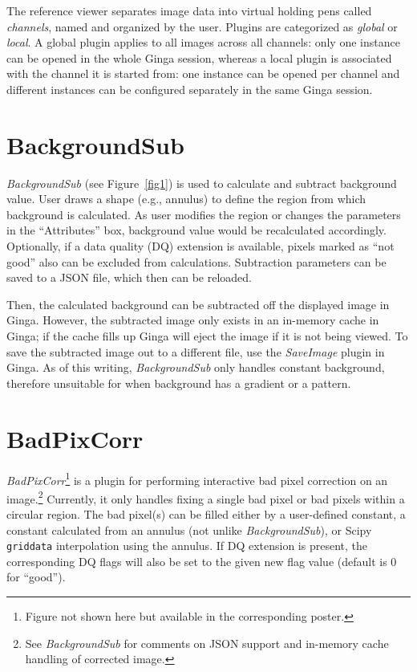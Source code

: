 \documentclass[11pt,twoside]{article}
\begin{document}
The reference viewer separates image data into virtual holding pens
called \emph{channels}, named and organized by the user.
Plugins are categorized as \emph{global} or \emph{local}.  A global
plugin applies to all images across all channels: only one instance can
be opened in the whole Ginga session, whereas a local plugin is
associated with the channel it is started from: one instance can be
opened per channel and different instances can be configured separately
in the same Ginga session.

\section{BackgroundSub}

{\em BackgroundSub} (see Figure~\ref{fig1}) is used to calculate and subtract
background value. User draws a shape (e.g., annulus) to define
the region from which background is calculated.
As user modifies the region or changes the parameters in the
``Attributes'' box, background value would be recalculated accordingly.
Optionally, if a data quality (DQ) extension is available, pixels marked as
``not good'' also can be excluded from calculations.
Subtraction parameters can be saved to a JSON file, which then can be reloaded.


Then, the calculated background can be subtracted off
the displayed image in Ginga.
However, the subtracted image only exists in an in-memory cache in Ginga;
if the cache fills up Ginga will eject the image if it is not being viewed.
To save the subtracted image out to a different file, use the {\em SaveImage}
plugin in Ginga.
As of this writing, {\em BackgroundSub} only handles constant
background, therefore unsuitable for when background has a gradient or a
pattern.

\section{BadPixCorr}

{\em BadPixCorr}\footnote{Figure not shown here but available in the
corresponding poster.} is a plugin for performing interactive bad pixel
correction on an image.\footnote{See {\em BackgroundSub} for
comments on JSON support and in-memory cache handling of corrected image.}
Currently, it only handles fixing a single bad pixel or
bad pixels within a circular region.
The bad pixel(s) can be filled either by a user-defined constant, a constant
calculated from an annulus (not unlike {\em BackgroundSub}), or Scipy
{\tt griddata} interpolation using the annulus.
If DQ extension is present, the corresponding DQ flags will also be set
to the given new flag value (default is 0 for ``good'').
\end{document}
